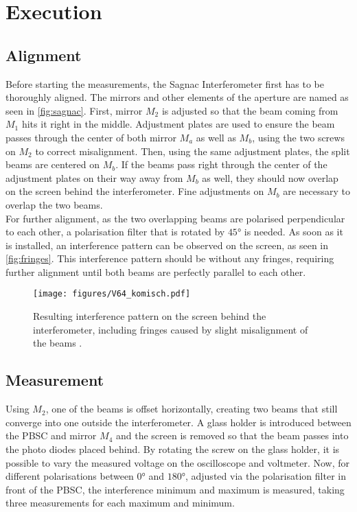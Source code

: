 \section{Execution}
\label{sec:execution}

\subsection{Alignment}
\label{subsec:alignment}

Before starting the measurements, the Sagnac Interferometer first has to be thoroughly aligned.
The mirrors and other elements of the aperture are named as seen in \autoref{fig:sagnac}.
First, mirror $M_2$ is adjusted so that the beam coming from $M_1$ hits it right in the middle.
Adjustment plates are used to ensure the beam passes through the center of both mirror $M_a$ as well as $M_b$, using the two screws on $M_2$ to correct misalignment.
Then, using the same adjustment plates, the split beams are centered on $M_b$.
If the beams pass right through the center of the adjustment plates on their way away from $M_b$ as well, they should now overlap on the screen behind the interferometer.
Fine adjustments on $M_b$ are necessary to overlap the two beams. \\
For further alignment, as the two overlapping beams are polarised perpendicular to each other, a polarisation filter that is rotated by $45°$ is needed.
As soon as it is installed, an interference pattern can be observed on the screen, as seen in \autoref{fig:fringes}.
This interference pattern should be without any fringes, requiring further alignment until both beams are perfectly parallel to each other.

\begin{figure}[H]
    \centering
    \texttt{[image: figures/V64\_komisch.pdf]}
    \caption{Resulting interference pattern on the screen behind the interferometer, including fringes caused by slight misalignment of the beams \cite{v64}.}
    \label{fig:fringes}
\end{figure}


\subsection{Measurement}
\label{subsec:measurement}
Using $M_2$, one of the beams is offset horizontally, creating two beams that still converge into one outside the interferometer.
A glass holder is introduced between the PBSC and mirror $M_4$ and the screen is removed so that the beam passes into the photo diodes placed behind.
By rotating the screw on the glass holder, it is possible to vary the measured voltage on the oscilloscope and voltmeter.
Now, for different polarisations between $0°$ and $180°$, adjusted via the polarisation filter in front of the PBSC, the interference minimum and maximum is measured,
taking three measurements for each maximum and minimum. \\


